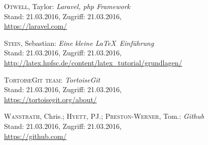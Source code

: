 \begin{thebibliography}{999}
 \textsc{Otwell}, Taylor: \textit{Laravel, php Framework}\\
			{\small Stand: 21.03.2016, Zugriff: 21.03.2016,} \\
			\url{https://laravel.com/}

 \textsc{Stein}, Sebastian: \textit{Eine kleine \LaTeX \  Einführung}\\
			{\small Stand: 21.03.2016, Zugriff: 21.03.2016,} \\
			\url{http://latex.hpfsc.de/content/latex_tutorial/grundlagen/}
			
 \textsc{TortoiseGit team}: \textit{TortoiseGit}\\
			{\small Stand: 21.03.2016, Zugriff: 21.03.2016,} \\
			\url{https://tortoisegit.org/about/}			
		
 \textsc{Wanstrath}, Chris.; \textsc{Hyett}, PJ.; \textsc{Preston-Werner}, Tom.:  \textit{Github}\\ 
			{\small Stand: 21.03.2016, Zugriff: 21.03.2016,}\\ 			
			\url{https://github.com/}			
			
\end{thebibliography}
